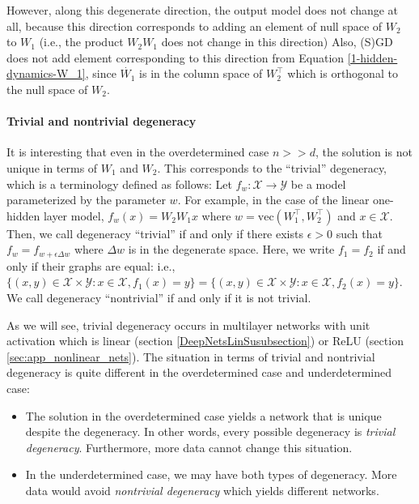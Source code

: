 \documentclass[10pt]{article}
\newcommand{\vect}{\mathrm{vec}}
\begin{document}
However, along this degenerate direction, the output model does not
change at all, because this direction corresponds to adding an element
of null space of $W_2$ to $W_1$ (i.e., the product $W_2W_1$ does not
change in this direction) Also, (S)GD does not add element
corresponding to this direction from Equation
\ref{1-hidden-dynamics-W_1}, since $\dot{W_1}$ is in the column space
of $W_2^\top$ which is orthogonal to the null space of $W_2$.

\paragraph{Trivial  and nontrivial degeneracy} 

It is interesting that even in the overdetermined case $n>>d$, the
solution is not unique in terms of $W_1$ and $W_2$.  This corresponds
to the ``trivial'' degeneracy, which is a terminology defined as
follows: Let $f_w: \mathcal{X} \rightarrow \mathcal{Y}$ be a model
parameterized by the parameter $w$. For example, in the case of the
linear one-hidden layer model, $f_w(x)=W_2W_1 x$ where
$w=\vect(W_1^\top, W_2^\top)$ and $x \in \mathcal X$. Then, we call
degeneracy ``trivial'' if and only if there exists $\epsilon >0$ such
that $f_w=f_{w+\epsilon \Delta w}$ where $\Delta w$ is in the
degenerate space. Here, we write $f_1=f_2$ if and only if their graphs
are equal: i.e.,
$\{(x,y) \in \mathcal X \times \mathcal Y: x \in \mathcal X,
f_1(x)=y\}=\{(x,y) \in \mathcal X \times \mathcal Y: x \in \mathcal X,
f_2(x)=y\}$. We call degeneracy ``nontrivial'' if and only if it is
not trivial.


As we will see, trivial degeneracy occurs in multilayer networks with
unit activation which is linear (section
\ref{DeepNetsLinSusubsection}) or ReLU (section
\ref{sec:app_nonlinear_nets}).  The situation in terms of trivial and
nontrivial degeneracy is quite different in the overdetermined case
and underdetermined case:

\begin{itemize}
\item The solution in the overdetermined case yields a network that is
  unique despite the degeneracy. In other words, every possible
  degeneracy is \textit{trivial degeneracy}. Furthermore, more data
  cannot change this situation.\item In the underdetermined case, we
  may have both types of degeneracy. More data would avoid
  \textit{nontrivial degeneracy} which yields different networks.
\end{itemize}
\end{document}
